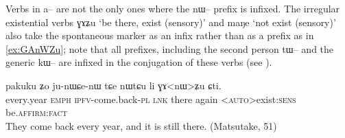 \documentclass[oldfontcommands,oneside,a4paper,11pt]{article}
\newcommand{\ipa}[1]{{\phon \mbox{#1}}} %
\begin{document}
Verbs in \ipa{a--} are not the only ones where the \ipa{nɯ--} prefix is infixed. The irregular existential verbs \ipa{ɣɤʑu} `be there, exist (sensory)'  and \ipa{maŋe} `not exist (sensory)' also take  the spontaneous marker as an infix rather than as a prefix as in \ref{ex:GAnWZu}; note that all prefixes, including the second person \ipa{tɯ--} and the generic \ipa{kɯ--} are infixed in the conjugation of these verbs (see \citealt{jacques12agreement, jacques15generic}).
\begin{exe}
\ex \label{ex:GAnWZu}
\gll 
 \ipa{pakuku}  	\ipa{ʑo}  	\ipa{ju-nɯɕe-nɯ}  	\ipa{tɕe}  	\ipa{nɯtɕu}  	\ipa{li}  	\ipa{ɣɤ<nɯ>ʑu}  	\ipa{ɕti.}  	\\
 every.year \textsc{emph} \textsc{ipfv}-come.back-\textsc{pl} \textsc{lnk} there again <\textsc{auto}>exist:\textsc{sens} be.\textsc{affirm:fact} \\
 \glt They come back every year, and it is still there. (Matsutake, 51)
\end{exe}
\end{document}

